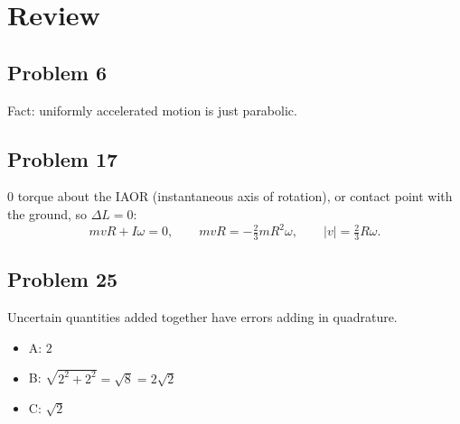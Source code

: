 \documentclass[11pt]{article}
\begin{document}
\section*{Review}

\subsection*{Problem 6}
Fact: uniformly accelerated motion is just parabolic.

\subsection*{Problem 17}
$0$ torque about the IAOR (instantaneous axis of rotation), or contact point with the ground, so $\Delta L=0$:
\[
mvR+I\omega=0,\qquad mvR=-\tfrac23 mR^2\omega,\qquad |v|=\tfrac23 R\omega.
\]

\subsection*{Problem 25}
Uncertain quantities added together have errors adding in quadrature.
\begin{itemize}[leftmargin=*, itemsep=0.25em]
\item A: $2$
\item B: $\sqrt{2^2+2^2}=\sqrt{8}=2\sqrt{2}$
\item C: $\sqrt{2}$
\end{itemize}
\end{document}
